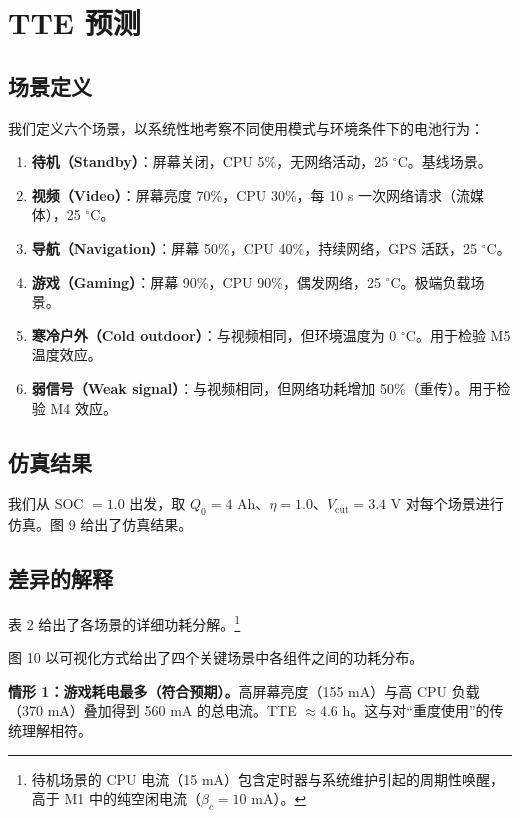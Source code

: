 \documentclass[11pt,a4paper]{ctexart}
\begin{document}
\section{TTE 预测}

\subsection{场景定义}

我们定义六个场景，以系统性地考察不同使用模式与环境条件下的电池行为：

\begin{enumerate}[leftmargin=2em]
\item \textbf{待机（Standby）}：屏幕关闭，CPU 5\%，无网络活动，25 $^{\circ}$C。基线场景。
\item \textbf{视频（Video）}：屏幕亮度 70\%，CPU 30\%，每 10 s 一次网络请求（流媒体），25 $^{\circ}$C。
\item \textbf{导航（Navigation）}：屏幕 50\%，CPU 40\%，持续网络，GPS 活跃，25 $^{\circ}$C。
\item \textbf{游戏（Gaming）}：屏幕 90\%，CPU 90\%，偶发网络，25 $^{\circ}$C。极端负载场景。
\item \textbf{寒冷户外（Cold outdoor）}：与视频相同，但环境温度为 0 $^{\circ}$C。用于检验 M5 温度效应。
\item \textbf{弱信号（Weak signal）}：与视频相同，但网络功耗增加 50\%（重传）。用于检验 M4 效应。
\end{enumerate}

\subsection{仿真结果}

我们从 SOC $= 1.0$ 出发，取 $Q_0 = 4$ Ah、$\eta = 1.0$、$V_{\mathrm{cut}} = 3.4$ V 对每个场景进行仿真。图 9 给出了仿真结果。

\subsection{差异的解释}

表 2 给出了各场景的详细功耗分解。\footnote{待机场景的 CPU 电流（15 mA）包含定时器与系统维护引起的周期性唤醒，高于 M1 中的纯空闲电流（$\beta_c = 10$ mA）。}

图 10 以可视化方式给出了四个关键场景中各组件之间的功耗分布。

\textbf{情形 1：游戏耗电最多（符合预期）。}高屏幕亮度（155 mA）与高 CPU 负载（370 mA）叠加得到 560 mA 的总电流。TTE $\approx 4.6$ h。这与对“重度使用”的传统理解相符。
\end{document}
